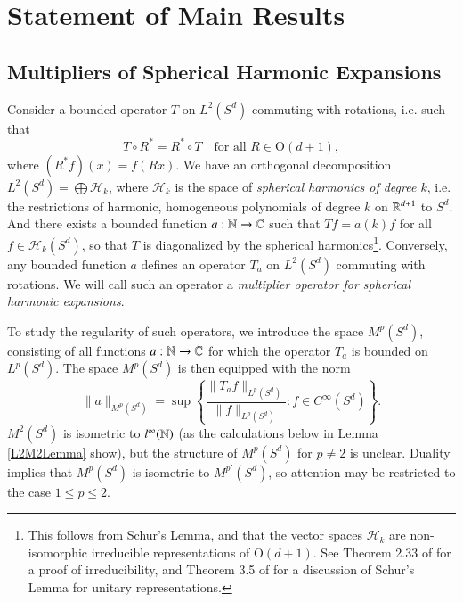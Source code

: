 
\chapter{Statement of Main Results} \label{cha:multipliers_of_an_elliptic_operator}

\section{Multipliers of Spherical Harmonic Expansions}

Consider a bounded operator $T$ on $L^2(S^d)$ commuting with rotations, i.e. such that
%
\begin{equation}
  T \circ R^* = R^* \circ T \quad\text{for all $R \in \text{O}(d+1)$},
\end{equation}
%
where $(R^*\! f)(x) = f(Rx)$. We have an orthogonal decomposition $L^2(S^d) = \bigoplus \mathcal{H}_k$, where $\mathcal{H}_k$ is the space of \emph{spherical harmonics of degree $k$}, i.e. the restrictions of harmonic, homogeneous polynomials of degree $k$ on $\operatorname{\mathbb{R}}^{d+1}$ to $S^d$. And there exists a bounded function $a: \operatorname{\mathbb{N}} \to \operatorname{\mathbb{C}}$ such that $Tf = a(k) f$ for all $f \in \mathcal{H}_k(S^d)$, so that $T$ is diagonalized by the spherical harmonics\footnote{This follows from Schur's Lemma, and that the vector spaces $\mathcal{H}_k$ are non-isomorphic irreducible representations of $\text{O}(d+1)$. See Theorem 2.33 of \cite{Sepanski} for a proof of irreducibility, and Theorem 3.5 of \cite{Folland} for a discussion of Schur's Lemma for unitary representations.}. Conversely, any bounded function $a$ defines an operator $T_a$ on $L^2(S^d)$ commuting with rotations. We will call such an operator a \emph{multiplier operator for spherical harmonic expansions}.

To study the regularity of such operators, we introduce the space $M^p(S^d)$, consisting of all functions $a: \operatorname{\mathbb{N}} \to \operatorname{\mathbb{C}}$ for which the operator $T_a$ is bounded on $L^p(S^d)$. The space $M^p(S^d)$ is then equipped with the norm
%
\begin{equation}
  \| a \|_{M^p(S^d)} = \sup \left\{ \frac{\| T_a f \|_{L^p(S^d)}}{\| f \|_{L^p(S^d)}} : f \in C^\infty(S^d) \right\}.
\end{equation}
%
$M^2(S^d)$ is isometric to $l^\infty(\operatorname{\mathbb{N}})$ (as the calculations below in Lemma \ref{L2M2Lemma} show), but the structure of $M^p(S^d)$ for $p \neq 2$ is unclear. Duality implies that $M^p(S^d)$ is isometric to $M^{p'}(S^d)$, so attention may be restricted to the case $1 \leq p \leq 2$.

